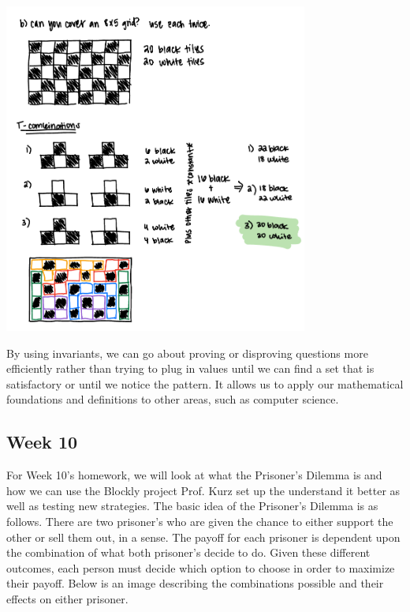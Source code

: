 \documentclass{article}
\theoremstyle{theorem}
\theoremstyle{definition}
\theoremstyle{remark}
\begin{document}
\begin{center}
  \includegraphics[width=10cm]{tetrisB.png}
\end{center}

By using invariants, we can go about proving or disproving questions more efficiently rather than trying to plug in values until we can find a set that is satisfactory or until we notice the pattern. It allows us to apply our mathematical foundations and definitions to other areas, 
such as computer science. 


\subsection{Week 10}

For Week 10's homework, we will look at what the Prisoner's Dilemma is and how we can use the Blockly project Prof. Kurz set up the understand it better as well as testing new strategies. The basic idea of the Prisoner's Dilemma is as follows. There are two prisoner's who are given the chance to either support the other or sell them out, in a sense. The payoff for each prisoner 
is dependent upon the combination of what both prisoner's decide to do. Given these different outcomes, each person must decide which option to choose in order to maximize their payoff. Below is an image describing the combinations possible and their effects on either prisoner. 
\end{document}
